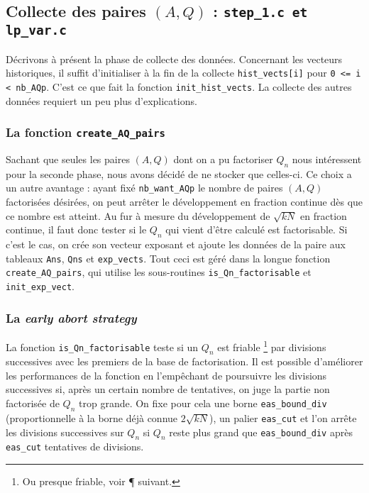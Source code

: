 \subsection{Collecte des paires $(A,Q)$ : \texttt{step\_1.c et lp\_var.c}}

Décrivons à présent la phase de collecte des données. Concernant les vecteurs
historiques, il suffit d'initialiser à la fin de la collecte
\texttt{hist\_vects[i]} pour \texttt{0 <= i < nb\_AQp}. C'est ce que fait la
fonction \texttt{init\_hist\_vects}. La collecte des autres données requiert un
peu plus d'explications. 

\subsubsection{La fonction \texttt{create\_AQ\_pairs}}

Sachant que seules les paires $(A,Q)$ dont on a pu factoriser $Q_n$ nous
intéressent pour la seconde phase, nous avons décidé de ne stocker que
celles-ci. Ce choix a un autre avantage : ayant fixé \texttt{nb\_want\_AQp} le
nombre de paires $(A, Q)$ factorisées désirées, on peut arrêter le
développement en fraction continue dès que ce nombre est atteint. Au fur à
mesure du développement de $\sqrt{kN}$ en fraction continue, il faut donc
tester si le $Q_n$ qui vient d'être calculé est factorisable. Si c'est le cas,
on crée son vecteur exposant et ajoute les données de la paire aux tableaux
\texttt{Ans}, \texttt{Qns} et \texttt{exp\_vects}. Tout ceci est géré dans la
longue fonction \texttt{create\_AQ\_pairs}, qui utilise les sous-routines
\texttt{is\_Qn\_factorisable} et \texttt{init\_exp\_vect}.


\subsubsection{La \textit{early abort strategy}}

La fonction \texttt{is\_Qn\_factorisable} teste si un $Q_n$ est friable
\footnote{Ou presque friable, voir ¶ suivant.} par divisions successives avec
les premiers de la base de factorisation. Il est possible d'améliorer les
performances de la fonction en l'empêchant de poursuivre les divisions 
successives si, après un certain nombre de tentatives, on juge la partie non 
factorisée de $Q_n$ trop grande. On fixe pour cela une borne
\texttt{eas\_bound\_div} (proportionnelle à la borne déjà connue $2\sqrt{kN}$),
un palier \texttt{eas\_cut} et l'on arrête les divisions successives sur $Q_n$ 
si $Q_n$ reste plus grand que \texttt{eas\_bound\_div} après \texttt{eas\_cut}
tentatives de divisions.

